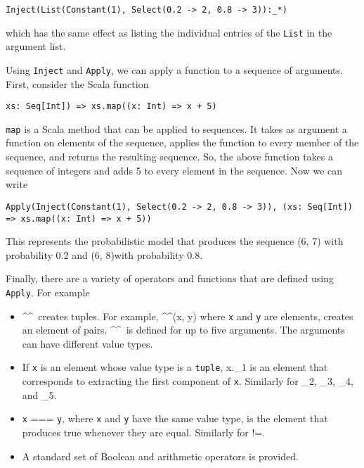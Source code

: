 \begin{flushleft}
\texttt{Inject(List(Constant(1), Select(0.2 -> 2, 0.8 -> 3)):\_*)}
\end{flushleft}

which has the same effect as listing the individual entries of the \texttt{List} in the argument list.

Using \texttt{Inject} and \texttt{Apply}, we can apply a function to a sequence of arguments. First, consider the Scala function

\begin{flushleft}
\texttt{xs: Seq[Int]) => xs.map((x: Int) => x + 5)}
\end{flushleft}

\texttt{map} is a Scala method that can be applied to sequences. It takes as argument a function on elements of the sequence, applies the function to every member of the sequence, and returns the resulting sequence. So, the above function takes a sequence of integers and adds 5 to every element in the sequence. Now we can write

\begin{flushleft}
\texttt{Apply(Inject(Constant(1), Select(0.2 -> 2, 0.8 -> 3)), 
\newline \tab (xs: Seq[Int]) => xs.map((x: Int) => x + 5))}
\end{flushleft}

This represents the probabilistic model that produces the sequence (6, 7) with probability 0.2 and (6, 8)with probability 0.8.


Finally, there are a variety of operators and functions that are defined using \texttt{Apply}. For example
\begin{itemize}
\item \textasciicircum \textasciicircum \ creates tuples. For example, \textasciicircum \textasciicircum(x, y) where \texttt{x} and \texttt{y} are elements, creates an element of pairs. \textasciicircum \textasciicircum \ is defined for up to five arguments. The arguments can have different value types.
\item If \texttt{x} is an element whose value type is a \texttt{tuple}, x.\_1 is an element that corresponds to extracting the first component of \texttt{x}. Similarly for \_2, \_3, \_4, and \_5.
\item \texttt{x} === \texttt{y}, where \texttt{x} and \texttt{y} have the same value type, is the element that produces true whenever they are equal. Similarly for !=.
\item A standard set of Boolean and arithmetic operators is provided.
\end{itemize}





